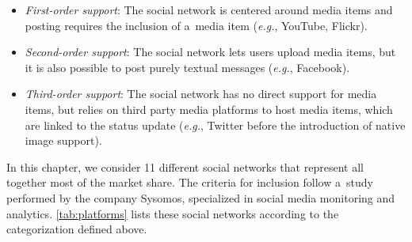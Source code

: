 {\begin{itemize}
  \item \emph{First-order support}:
        The social network is centered around media items
        and posting requires the inclusion of a~media item
        (\emph{e.g.}, YouTube, Flickr).
  \item \emph{Second-order support}:
        The social network lets users upload media items,
        but it is also possible to post purely textual messages
        (\emph{e.g.}, Facebook).
  \item \emph{Third-order support}:
        The social network has no direct support for media items,
        but relies on third party media platforms
        to host media items, which are linked to the status update
        (\emph{e.g.}, Twitter before the introduction of native
        image support).
\end{itemize}

In this chapter, we consider 11 different social networks
that represent all together most of the market share.
The criteria for inclusion follow
a~study~\cite{levine2011howpeopleshare}
performed by the company Sysomos, specialized in social media
monitoring and analytics.
\autoref{tab:platforms} lists these social networks according to the categorization defined above.

}
